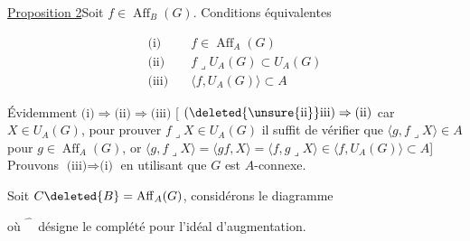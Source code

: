 \uline{Proposition 2}\quad Soit $f\in\operatorname{Aff}_B(G)$. Conditions équivalentes


\[
\begin{aligned}
\text{(i)}\quad &f\in\operatorname{Aff}_A(G)\\
\text{(ii)}\quad &f\mathbin{\lrcorner} U_A(G)\subset U_A(G)\\
\text{(iii)}\quad &\langle f,U_A(G)\rangle\subset A
\end{aligned}
\]

Évidemment $\text{(i)}\Rightarrow\text{(ii)}\Rightarrow\text{(iii)}$ [ $\text{(}\deleted{\unsure{\mathrm{ii}}}\mathrm{iii}\text{)}\Rightarrow\text{(ii)}$ car  $X\in U_A(G)$, pour prouver $f\mathbin{\lrcorner}X\in U_A(G)$ il suffit  de vérifier que $\langle g,f\mathbin{\lrcorner}X\rangle\in A$ pour $g\in\operatorname{Aff}_A(G)$, or $\langle g,f\mathbin{\lrcorner}X\rangle=\langle gf,X\rangle=\langle f,g\mathbin{\lrcorner}X\rangle\in\langle f,U_A(G)\rangle\subset A$] Prouvons $\text{(iii)}\Rightarrow\text{(i)}$ en utilisant que $G$ est $A$-connexe.

Soit $C\deleted{B}=\operatorname{Aff}_A(G)$, considérons le diagramme


où $\widehat{\phantom C}$ désigne le  complété pour l'idéal d'augmentation.
